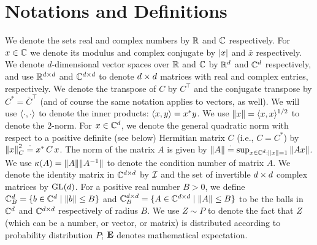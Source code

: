 \section{Notations and Definitions}\label{sec:def}
We denote the sets real and complex numbers by $\mathbb{R}$ and $\mathbb{C}$ respectively. For $x\in \mathbb{C}$ we denote its modulus and complex conjugate by $\left|x\right|$ and $\bar{x}$ respectively. We denote $d$-dimensional vector spaces over $\mathbb{R}$ and $\mathbb{C}$ by $\mathbb{R}^{d}$ and $\mathbb{C}^{d}$ respectively, and use $\mathbb{R}^{d \times d}$ and $\mathbb{C}^{d \times d}$ to denote $d \times d$ matrices with real and complex entries, respectively. We denote the transpose of $C$ by $C^\top$ and the conjugate transpose by $C^*={\bar{C}}^\top$ (and of course the same notation applies to vectors, as well). We will use $\langle\cdot,\cdot\rangle$ to denote the inner products: $\langle x,y\rangle=x^* y$. 
We use $\left\| x\right\| = \langle x,x\rangle^{1/2}$ to denote the $2$-norm.
For $x\in\mathbb{C}^d$, we denote the general quadratic norm with respect to a positive definite (see below) Hermitian matrix $C$ (i.e., $C=C^*$) by $\left\| x\right\|^2_C\stackrel{\cdot}{=} x^*\, C \,x$.
The norm of the matrix $A$ is given by $\left\| A\right\|\stackrel{\cdot}{=} \sup_{x\in \mathbb{C}^d:\left\| x\right\|=1} \left\| Ax\right\|$.  We use $\kappa(A)=\| A\|\| A^{-1}\|$ to denote the condition number of matrix $A$. We denote the identity matrix in $\mathbb{C}^{d \times d}$ by $\mathcal{I}$ and the set of invertible $d \times d$ complex matrices by $\mathrm{GL}(d)$.
For a positive real number $B>0$, we define $\mathbb{C}^{d}_B=\{b\in \mathbb{C}^d\mid \left\| b\right\|\leq B\}$ and $\mathbb{C}^{d \times d}_B=\{A\in \mathbb{C}^{d \times d}\mid \left\| A\right\|\leq B\}$ to be the balls in $\mathbb{C}^d$ and $\mathbb{C}^{d\times d}$ respectively of radius $B$.
We use $Z\sim P$ to denote the fact that $Z$ (which can be a number, or vector, or matrix) is distributed according to probability distribution $P$;
$\mathbf{E}$ denotes mathematical expectation.

